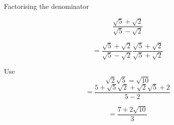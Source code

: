 \documentclass[11pt]{article}
\begin{document}
Factorising the denominator
\begin{tcolorbox}[colback=green!5!white,colframe=green!75!black]
$$  \frac{\sqrt{5}+\sqrt{2}}{\sqrt{5}-\sqrt{2}}$$\newline

$$ = \frac{\sqrt{5}+\sqrt{2}}{\sqrt{5}-\sqrt{2}}\frac{\sqrt{5}+\sqrt{2}}{\sqrt{5}+\sqrt{2}}$$\newline

Use $$\sqrt{2}\sqrt{5}=\sqrt{10}$$ \newline
$$  =\frac{5+\sqrt{5}\sqrt{2}+\sqrt{2}\sqrt{5}+2}{5-2} $$ \newline

$$ = \frac{7+2\sqrt{10}}{3}$$ \newline

\end{tcolorbox}
\end{document}
